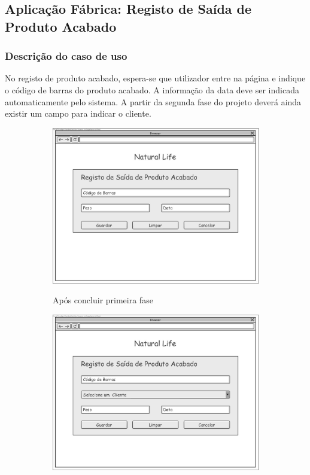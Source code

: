 \subsection{Aplicação Fábrica: Registo de Saída de Produto Acabado}
\subsubsection*{Descrição do caso de uso}
No registo de produto acabado, espera-se que utilizador entre na página e indique o código de barras do produto acabado. A informação da data deve ser indicada automaticamente pelo sistema. A partir da segunda fase do projeto deverá ainda existir um campo para indicar o cliente.

\begin{figure}[H]
	\centering
	
	\begin{subfigure}[t]{0.45\linewidth}
		\includegraphics[width=\linewidth]{figuras/Diagramas_vp/DI_Fabrica_5_Saida_de_Produto_Acabado_1_Fase.jpg}
		\label{fig:di_saida_prod_acabado_1}
		\caption{Após concluir primeira fase}
	\end{subfigure}
	\begin{subfigure}[t]{0.45\linewidth}
		\includegraphics[width=\linewidth]{figuras/Diagramas_vp/DI_Fabrica_5_Saida_de_Produto_Acabado_2_Fase.jpg}

\end{subfigure}
\end{figure}
